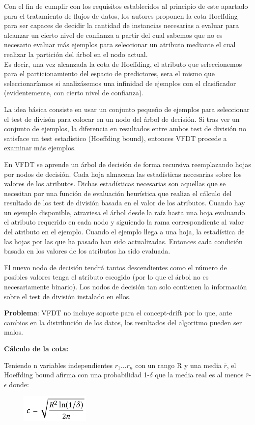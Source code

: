 Con el fin de cumplir con los requisitos establecidos al principio de este apartado para el tratamiento de flujos de datos, los autores proponen la cota Hoeffding para ser capaces de decidir la cantidad de instancias necesarias a evaluar para alcanzar un cierto nivel de confianza a partir del cual sabemos que no es necesario evaluar más ejemplos para seleccionar un atributo mediante el cual realizar la partición del árbol en el nodo actual.\\
Es decir, una vez alcanzada la cota de Hoeffding, el atributo que seleccionemos para el particionamiento del espacio de predictores, sera el mismo que seleccionaríamos si analizásemos una infinidad de ejemplos con el clasificador (evidentemente, con cierto nivel de confianza).

La idea básica consiste en usar un conjunto pequeño de ejemplos para seleccionar el test de divisón para colocar en un nodo del árbol de decisión.
Si tras ver un conjunto de ejemplos, la diferencia en resultados entre ambos test de división no satisface un test estadístico (Hoeffding bound), entonces VFDT procede a examinar más ejemplos.

En VFDT se aprende un árbol de decisión de forma recursiva reemplazando hojas por nodos de decisión. Cada hoja almacena las estadísticas necesarias sobre los valores de los
atributos. Dichas estadísticas necesarias son aquellas que se necesitan por una función de evaluación heurística que realiza el cálculo del resultado de los test de división 
basada en el valor de los atributos.
Cuando hay un ejemplo disponible, atraviesa el árbol desde la raíz hasta una hoja evaluando el atributo requerido en cada nodo y siguiendo la rama correspondiente al valor
del atributo en el ejemplo.
Cuando el ejemplo llega a una hoja, la estadística de las hojas por las que ha pasado han sido actualizadas.
Entonces cada condición basada en los valores de los atributos ha sido evaluada.

El nuevo nodo de decisión tendrá tantos descendientes como el número de posibles valores tenga el atributo escogido (por lo que el árbol no es necesariamente binario).
Los nodos de decisión tan solo contienen la información sobre el test de división instalado en ellos.

\textbf{Problema}: VFDT no incluye soporte para el concept-drift por lo que, ante cambios en la distribución de los datos, los resultados del algoritmo pueden ser malos.

\textbf{Cálculo de la cota:}

Teniendo n variables independientes $r_{1}...r_{n}$ con un rango R y una media $\bar{r}$, el Hoeffding bound afirma con una probabilidad 1-$\delta$ que la media real es al menos $\bar{r}$-$\epsilon$ donde:
\begin{figure}[H]
	\centering
	\includegraphics[width=0.3\textwidth]{imagenes/hoeffdingbound} 
\end{figure}

